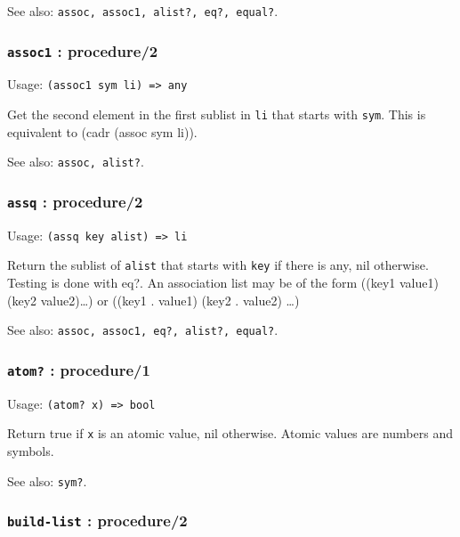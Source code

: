 \documentclass[
]{article}
\newcommand{\passthrough}[1]{#1}
\begin{document}
See also: \passthrough{\lstinline!assoc, assoc1, alist?, eq?, equal?!}.

\hypertarget{assoc1-procedure2}{%
\subsubsection{\texorpdfstring{\texttt{assoc1} :
procedure/2}{assoc1 : procedure/2}}\label{assoc1-procedure2}}

Usage: \passthrough{\lstinline!(assoc1 sym li) => any!}

Get the second element in the first sublist in
\passthrough{\lstinline!li!} that starts with
\passthrough{\lstinline!sym!}. This is equivalent to (cadr (assoc sym
li)).

See also: \passthrough{\lstinline!assoc, alist?!}.

\hypertarget{assq-procedure2}{%
\subsubsection{\texorpdfstring{\texttt{assq} :
procedure/2}{assq : procedure/2}}\label{assq-procedure2}}

Usage: \passthrough{\lstinline!(assq key alist) => li!}

Return the sublist of \passthrough{\lstinline!alist!} that starts with
\passthrough{\lstinline!key!} if there is any, nil otherwise. Testing is
done with eq?. An association list may be of the form ((key1
value1)(key2 value2)\ldots) or ((key1 . value1) (key2 . value2) \ldots)

See also: \passthrough{\lstinline!assoc, assoc1, eq?, alist?, equal?!}.

\hypertarget{atom-procedure1}{%
\subsubsection{\texorpdfstring{\texttt{atom?} :
procedure/1}{atom? : procedure/1}}\label{atom-procedure1}}

Usage: \passthrough{\lstinline!(atom? x) => bool!}

Return true if \passthrough{\lstinline!x!} is an atomic value, nil
otherwise. Atomic values are numbers and symbols.

See also: \passthrough{\lstinline!sym?!}.

\hypertarget{build-list-procedure2}{%
\subsubsection{\texorpdfstring{\texttt{build-list} :
procedure/2}{build-list : procedure/2}}\label{build-list-procedure2}}
\end{document}
